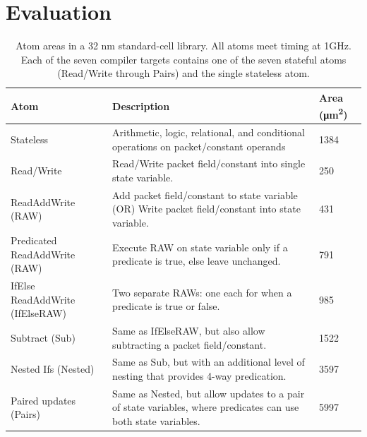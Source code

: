 \section{Evaluation}
\label{s:eval}

\begin{table}[!t]
  \begin{scriptsize}
  \begin{tabular}{|p{}|p{}|p{}|}
    \hline
    Atom & Description & Area (\si{\micro\metre\squared})\\
    \hline
    Stateless & Arithmetic, logic, relational, and conditional operations on packet/constant operands & 1384 \\
    \hline
    Read/Write & Read/Write packet field/constant into single state variable. & 250 \\
    \hline
    ReadAddWrite (RAW) & Add packet field/constant to state variable (OR) Write packet field/constant into state variable. & 431 \\
    \hline
    Predicated ReadAddWrite (RAW) & Execute RAW on state variable only if a predicate is true, else leave unchanged. & 791 \\
    \hline
    IfElse ReadAddWrite (IfElseRAW) & Two separate RAWs: one each for when a predicate is true or false. & 985 \\
    \hline
    Subtract (Sub) & Same as IfElseRAW, but also allow subtracting a packet field/constant. & 1522 \\
    \hline
    Nested Ifs (Nested) & Same as Sub, but with an additional level of nesting that provides 4-way predication. & 3597 \\
    \hline
    Paired updates (Pairs) & Same as Nested, but allow updates to a pair of state variables, where predicates can use both state variables. & 5997 \\
    \hline
  \end{tabular}
  \end{scriptsize}
  \caption{Atom areas in a 32 nm standard-cell library.  All atoms meet timing
  at 1GHz. Each of the seven compiler targets contains one of the seven
  stateful atoms (Read/Write through Pairs) and the single stateless atom.}
  \label{tab:templates}
\end{table}

